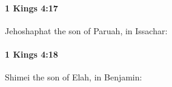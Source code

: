 		\paragraph{1 Kings 4:17} %
			\label{1KINGS-4-17}

			Jehoshaphat the son of Paruah, in Issachar:


		\paragraph{1 Kings 4:18} %
			\label{1KINGS-4-18}

			Shimei the son of Elah, in Benjamin:


